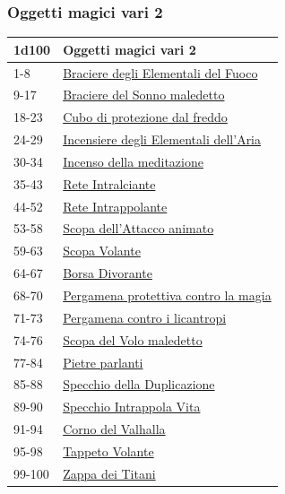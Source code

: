 \begin{multicols}{2}
{\subsubsection{Oggetti magici vari 2}\hypertarget{Oggetti Magici Vari 2}{}

{\small\begin{tabularx}{\linewidth}{ll}
		\toprule
\rowcolor{gray!20}\textbf{1d100} & \textbf{Oggetti magici vari 2}\\
\toprule
1-8 &\hyperlink{Braciere degli Elementali del Fuoco}{Braciere degli Elementali del Fuoco}\\
\rowcolor{gray!20}9-17 &\hyperlink{Braciere del Sonno maledetto}{Braciere del Sonno maledetto}\\
18-23 & \hyperlink{Cubo di protezione dal freddo}{Cubo di protezione dal freddo}\\
\rowcolor{gray!20}24-29 & \hyperlink{Incensiere degli Elementali dell'Aria}{Incensiere degli Elementali dell'Aria}\\
30-34 & \hyperlink{Incenso della meditazione}{Incenso della meditazione}\\
\rowcolor{gray!20}35-43 & \hyperlink{Rete Intralciante}{Rete Intralciante}\\
44-52 & \hyperlink{Rete Intrappolante}{Rete Intrappolante}\\
\rowcolor{gray!20}53-58 & \hyperlink{Scopa dell'Attaccoanimato}{Scopa dell'Attacco animato}\\
59-63 & \hyperlink{Scopa Volante}{Scopa Volante}\\
\rowcolor{gray!20}64-67 & \hyperlink{Borsa Divorante}{Borsa Divorante}\\
68-70 & \hyperlink{Pergamena protettiva contro la magia}{Pergamena protettiva contro la magia}\\
\rowcolor{gray!20}71-73 & \hyperlink{Pergamena contro i licantropi}{Pergamena contro i licantropi}\\
74-76 & \hyperlink{Scopa del Volo maledetto}{Scopa del Volo maledetto}\\
\rowcolor{gray!20}77-84 & \hyperlink{Pietre parlanti}{Pietre parlanti}\\
85-88 & \hyperlink{Specchio della Duplicazione}{Specchio della Duplicazione}\\
\rowcolor{gray!20}89-90 & \hyperlink{Specchio IntrappolaVita}{Specchio Intrappola Vita}\\
91-94 & \hyperlink{Corno del Valhalla}{Corno del Valhalla}\\
\rowcolor{gray!20}95-98 & \hyperlink{Tappe to Volante}{Tappeto Volante}\\
99-100 & \hyperlink{Zappa dei Titani}{Zappa dei Titani}
\end{tabularx}}

}
\end{multicols}
